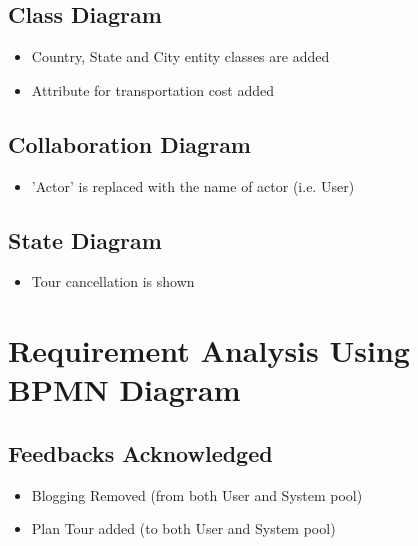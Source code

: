 \documentclass[12pt]{article}
\begin{document}
\subsection{Class Diagram}
\begin{itemize}
    \item Country, State and City entity classes are added
    \item Attribute for transportation cost added
\end{itemize}
\subsection{Collaboration Diagram}
\begin{itemize}
    \item 'Actor' is replaced with the name of actor (i.e. User) 
\end{itemize}
\subsection{State Diagram}
\begin{itemize}
    \item Tour cancellation is shown
\end{itemize}


\newpage

\section{Requirement Analysis Using BPMN Diagram}
\subsection{Feedbacks Acknowledged}

\begin{itemize}
    \item Blogging Removed (from both User and System pool)
    \item Plan Tour added (to both User and System pool)
\end{itemize}
\end{document}
